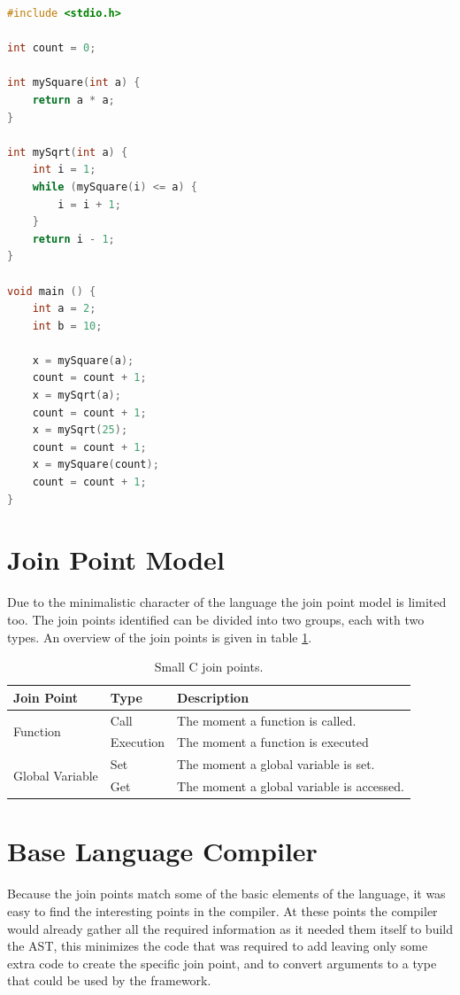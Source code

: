 \documentclass[a4paper]{report}
\begin{document}
\begin{lstlisting}[language=C, multicols=2, caption=A simple Small C program., label=lst:SmallC_Example]
#include <stdio.h>

int count = 0;

int mySquare(int a) {
	return a * a;
}

int mySqrt(int a) {
	int i = 1;
	while (mySquare(i) <= a) {
		i = i + 1;
	}	
	return i - 1;
}

void main () {
	int a = 2;
	int b = 10;
	
	x = mySquare(a);
	count = count + 1;
	x = mySqrt(a);
	count = count + 1;
	x = mySqrt(25);
	count = count + 1;
	x = mySquare(count);
	count = count + 1;
}
\end{lstlisting}

\section{Join Point Model}
Due to the minimalistic character of the language the join point model is limited too. The join points identified can be divided into two groups, each with two types. An overview of the join points is given in table \ref{tab:SmallC_JoinPoints}.
\begin{table}
\centering
\begin{tabular}{|l|l|l|}
\hline
Join Point & Type & Description\\
\hline
\multirow{2}{*}{Function} & Call & The moment a function is called.\\
& Execution & The moment a function is executed\\
\hline
\multirow{2}{*}{Global Variable} & Set & The moment a global variable is set.\\
& Get & The moment a global variable is accessed.\\
\hline
\end{tabular}
\caption{Small C join points.}
\label{tab:SmallC_JoinPoints}
\end{table}

\section{Base Language Compiler}
Because the join points match some of the basic elements of the language, it was easy to find the interesting points in the compiler. At these points the compiler would already gather all the required information as it needed them itself to build the AST, this minimizes the code that was required to add leaving only some extra code to create the specific join point, and to convert arguments to a type that could be used by the framework.
\end{document}
